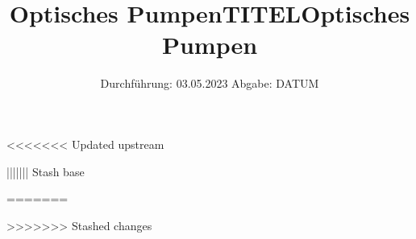 

<<<<<<< Updated upstream
\subject{VERSUCH 21}
\title{Optisches Pumpen}
||||||| Stash base
\subject{VERSUCH NUMMER}
\title{TITEL}
=======
\subject{V21}
\title{Optisches Pumpen}
>>>>>>> Stashed changes
\date{%
  Durchführung: 03.05.2023
  \hspace{3em}
  Abgabe: DATUM
}



\maketitle
\thispagestyle{empty}
\tableofcontents
\newpage






\printbibliography{}


